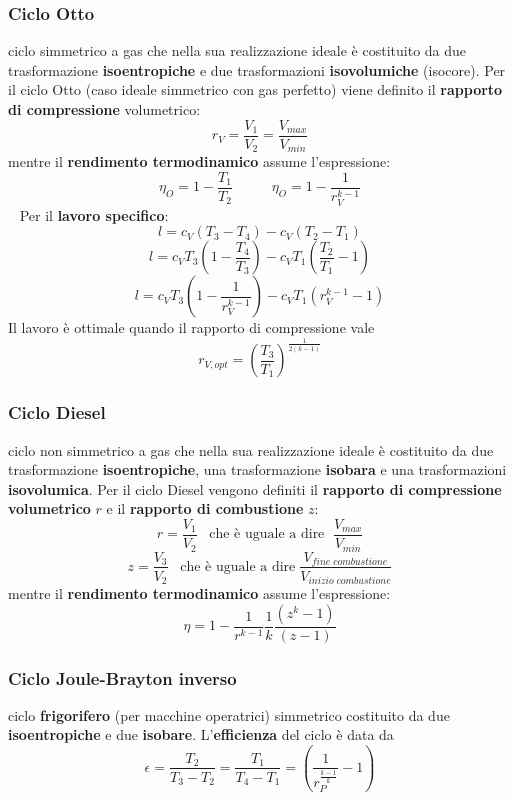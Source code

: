 \subsubsection{Ciclo Otto}
ciclo simmetrico a gas che nella sua realizzazione ideale è costituito da due
trasformazione \textbf{isoentropiche} e due trasformazioni \textbf{isovolumiche} (isocore). \newline
\newline
Per il ciclo Otto (caso ideale simmetrico con gas perfetto) viene definito il \textbf{rapporto di compressione} volumetrico:
\[
    r_V = \frac{V_1}{V_2} = \frac{V_{max}}{V_{min}}
\]
mentre il \textbf{rendimento termodinamico} assume l'espressione:
\[
    \eta_{O} = 1- \frac{T_1}{T_2} \;\;\;\;\;\;\;\;\;\; \eta_{O} = 1- \frac{1}{r_V^{k-1}}
\]
\ \newline
Per il \textbf{lavoro specifico}:
\[
    l = c_V(T_3-T_4) -c_V(T_2-T_1)
\]
\[
    l = c_VT_3\left(1-\frac{T_4}{T_3}\right) - c_V T_1 \left(\frac{T_2}{T_1}-1 \right)
\]
\[
    l = c_V T_3 \left(1- \frac{1}{r_V^{k-1}}\right) - c_V T_1 (r_V^{k-1} - 1)
\]
Il lavoro è ottimale quando il rapporto di compressione vale
\[
    r_{V,opt} = \left(\frac{T_3}{T_1}\right)^{\frac{1}{2(k-1)}}
\]
\subsubsection{Ciclo Diesel}
ciclo non simmetrico a gas che nella sua realizzazione ideale è costituito da due
trasformazione \textbf{isoentropiche}, una trasformazione \textbf{isobara} e una trasformazioni \textbf{isovolumica}. \newline
\newline
Per il ciclo Diesel vengono definiti il \textbf{rapporto di compressione volumetrico} $r$ e il \textbf{rapporto di
combustione} $z$: 
\[
    r = \frac{V_1}{V_2} \;\;\;\text{che è uguale a dire }\; \frac{V_{max}}{V_{min}}
\]
\[
    z = \frac{V_3}{V_2} \;\;\;\text{che è uguale a dire}\; \frac{V_{fine \; combustione}}{V_{inizio \; combustione}}
\]
mentre il \textbf{rendimento termodinamico} assume l'espressione:
\[
    \eta = 1- \frac{1}{r^{k-1}} \frac{1}{k} \frac{(z^k - 1)}{(z-1)}
\]
\subsubsection{Ciclo Joule-Brayton inverso}
ciclo \textbf{frigorifero} (per macchine operatrici) simmetrico costituito da due \textbf{isoentropiche} e due \textbf{isobare}.\newline
\newline
L'\textbf{efficienza} del ciclo è data da
\[
    \epsilon = \frac{T_2}{T_3-T_2} = \frac{T_1}{T_4-T_1} = \left(\frac{1}{r_P^{\frac{k-1}{k}}}-1\right)
\]
